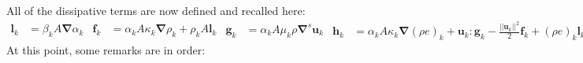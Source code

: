 \documentclass[preprint,10pt]{elsarticle}
\newcommand{\grad}{\mbold{\nabla}}
\newcommand{\mbold}[1]{\boldsymbol#1}
\begin{document}
All of the dissipative terms are now defined and recalled here:
%
\begin{subequations}\label{eq:visc-reg-7-equ-sect4}
\begin{align}
  \mbold l_k &= \beta_k A \grad \alpha_k 
\end{align}
\begin{align}
  \mbold f_k &= \alpha_k A \kappa_k \grad \rho_k + \rho_k A \mbold l_k 
\end{align}
\begin{align}
  \mbold g_k &= \alpha_k A \mu_k \rho \grad^s \mbold u_k 
\end{align}
\begin{align}
  \mbold h_k &=  \alpha_k A \kappa_k \grad \left( \rho e \right)_k + \mbold u_k : \mbold g_k - \frac{|| \mbold u_k||^2}{2} \mbold f_k + (\rho e)_k \mbold l_k 
\end{align}
\end{subequations}
%
At this point, some remarks are in order:
\end{document}
